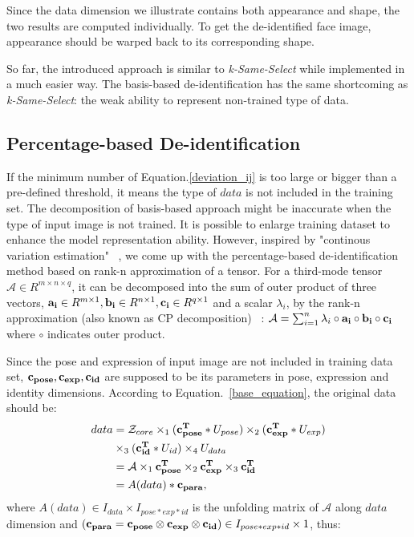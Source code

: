 				Since the data dimension we illustrate contains both appearance and shape, the two results are computed individually. To get the de-identified face image, appearance should be warped back to its corresponding shape.

				So far, the introduced approach is similar to {\it k-Same-Select} while implemented in a much easier way. The basis-based de-identification has the same shortcoming as {\it k-Same-Select}: the weak ability to represent non-trained type of data.

		\subsection{Percentage-based De-identification}
		If the minimum number of Equation.\ref{deviation_ij} is too large or bigger than a pre-defined threshold, it means the type of $data$ is not included in the training set. The decomposition of basis-based approach might be inaccurate when the type of input image is not trained. It is possible to enlarge training dataset to enhance the model representation ability. However,  inspired by "continous variation estimation" ~\cite{TPAMI09}, we come up with the percentage-based de-identification method based on rank-n approximation of a tensor. For a third-mode tensor $\mathcal{A} \in R^{m \times n \times q}$, it can be decomposed into the sum of outer product of three vectors, ${\bf a_i} \in R^{m \times 1}, {\bf b_i} \in R^{n \times 1}, {\bf c_i} \in R^{q \times 1}$ and a scalar $\lambda_i$, by the rank-n approximation (also known as CP decomposition) ~\cite{Lathauwer_rank}: $\mathcal{A} = \sum_{i=1}^{n}\lambda_i \circ {\bf a_i} \circ {\bf b_i} \circ {\bf c_i}$ where $\circ$ indicates outer product. 

		Since the pose and expression of input image are not included in training data set, ${\bf c_{pose},c_{exp},c_{id}}$ are supposed to be its parameters in pose, expression and identity dimensions. According to Equation.~\ref{base_equation}, the original data should be:
		\begin{equation}
			\begin{aligned}
				data & = \mathcal{Z}_{core} \times_1 ( {\bf c_{pose}^T} * U_{pose} ) \times_2 ({\bf c_{exp}^T} * U_{exp}) \\ & \times_3 ({\bf c_{id}^T} * U_{id}) \times_4 U_{data} \\
				& = \mathcal{A} \times_1 {\bf c_{pose}^T} \times_2 {\bf c_{exp}^T} \times_3 {\bf c_{id}^T} \\
				& = A(data) * {\bf c_{para}}, \\
			\end{aligned}
		\end{equation}
		where $A(data) \in I_{data}\times I_{pose*exp*id}$ is the unfolding matrix of $\mathcal{A}$ along $data$ dimension and ${(\bf c_{para}} = {\bf c_{pose}} \otimes {\bf c_{exp}} \otimes {\bf c_{id}}) \in I_{pose*exp*id} \times 1$, thus:
		
